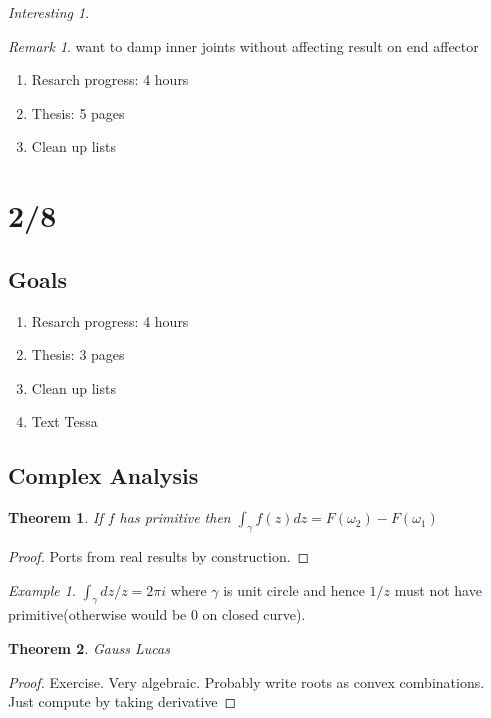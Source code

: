 \documentclass[11pt]{article}
\newtheorem{theorem}{Theorem}
\theoremstyle{remark}
\newtheorem{remark}{Remark}
\newtheorem{interest}{Interesting}
\newtheorem{example}{Example}
\begin{document}
\begin{interest}
\begin{remark}
	want to damp inner joints without affecting result on end affector
\end{remark}

\begin{enumerate}
	\item Resarch progress: 4 hours
	\item Thesis: 5 pages
	\item Clean up lists
\end{enumerate}

\section{2/8}

\subsection{Goals}

\begin{enumerate}
	\item Resarch progress: 4 hours
	\item Thesis: 3 pages
	\item Clean up lists
	\item Text Tessa
\end{enumerate}

\subsection{Complex Analysis}

\begin{theorem}
	If $f$ has primitive then $\int_{\gamma} f(z)dz = F(\omega_2) - F(\omega_1)$
\end{theorem}

\begin{proof}
	Ports from real results by construction.
\end{proof}

\begin{example}
	$\int_{\gamma} dz/z=2\pi i$ where $\gamma$ is unit circle and hence $1/z$ must not have primitive(otherwise would be 0 on closed curve).
\end{example}

\begin{theorem}
	Gauss Lucas
\end{theorem}

\begin{proof}
	Exercise. Very algebraic. Probably write roots as convex combinations. Just compute by taking derivative


\end{proof}
\end{interest}
\end{document}
